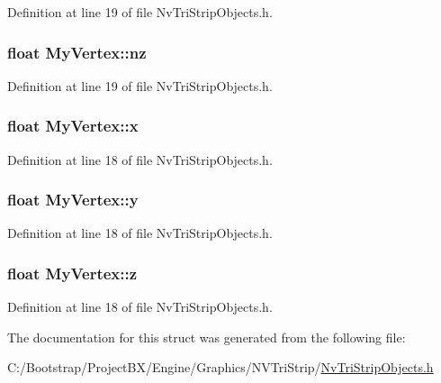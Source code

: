Definition at line 19 of file NvTriStripObjects.h.\hypertarget{struct_my_vertex_a0d4be6347754bcb5074ddd310afb988}{
\subsubsection[{nz}]{\setlength{\rightskip}{0pt plus 5cm}float {\bf MyVertex::nz}}}
\label{struct_my_vertex_a0d4be6347754bcb5074ddd310afb988}




Definition at line 19 of file NvTriStripObjects.h.\hypertarget{struct_my_vertex_e0b950f1d1062d8234a207d8237b4a89}{
\subsubsection[{x}]{\setlength{\rightskip}{0pt plus 5cm}float {\bf MyVertex::x}}}
\label{struct_my_vertex_e0b950f1d1062d8234a207d8237b4a89}




Definition at line 18 of file NvTriStripObjects.h.\hypertarget{struct_my_vertex_8a39d11e87aca9849e57a5b259c1b7bf}{
\subsubsection[{y}]{\setlength{\rightskip}{0pt plus 5cm}float {\bf MyVertex::y}}}
\label{struct_my_vertex_8a39d11e87aca9849e57a5b259c1b7bf}




Definition at line 18 of file NvTriStripObjects.h.\hypertarget{struct_my_vertex_3577ad7fec9b13a0de8722808f5e1802}{
\subsubsection[{z}]{\setlength{\rightskip}{0pt plus 5cm}float {\bf MyVertex::z}}}
\label{struct_my_vertex_3577ad7fec9b13a0de8722808f5e1802}




Definition at line 18 of file NvTriStripObjects.h.

The documentation for this struct was generated from the following file:\begin{CompactItemize}
\item 
C:/Bootstrap/ProjectBX/Engine/Graphics/NVTriStrip/\hyperlink{_nv_tri_strip_objects_8h}{NvTriStripObjects.h}\end{CompactItemize}
